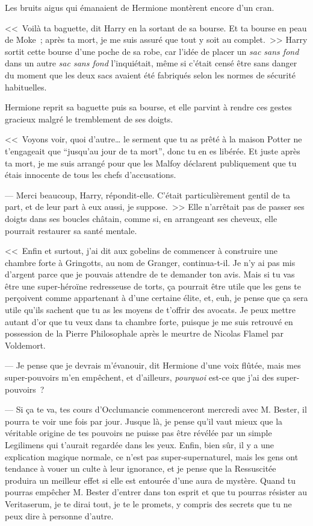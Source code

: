 Les bruits aigus qui émanaient de Hermione montèrent encore d'un cran.

<<~Voilà ta baguette, dit Harry en la sortant de sa bourse. Et ta bourse en peau de Moke~; après ta mort, je me suis assuré que tout y soit au complet.~>> Harry sortit cette bourse d'une poche de sa robe, car l'idée de placer un \emph{sac sans fond} dans un autre \emph{sac sans fond} l'inquiétait, même si c'était censé être sans danger du moment que les deux sacs avaient été fabriqués selon les normes de sécurité habituelles.

Hermione reprit sa baguette puis sa bourse, et elle parvint à rendre ces gestes gracieux malgré le tremblement de ses doigts.

<<~Voyons voir, quoi d'autre… le serment que tu as prêté à la maison Potter ne t'engageait que “jusqu'au jour de ta mort”, donc tu en es libérée. Et juste après ta mort, je me suis arrangé pour que les Malfoy déclarent publiquement que tu étais innocente de tous les chefs d'accusations.

--- Merci beaucoup, Harry, répondit-elle. C'était particulièrement gentil de ta part, et de leur part à eux aussi, je suppose.~>> Elle n'arrêtait pas de passer ses doigts dans ses boucles châtain, comme si, en arrangeant ses cheveux, elle pourrait restaurer sa santé mentale.

<<~Enfin et surtout, j'ai dit aux gobelins de commencer à construire une chambre forte à Gringotts, au nom de Granger, continua-t-il. Je n'y ai pas mis d'argent parce que je pouvais attendre de te demander ton avis. Mais si tu vas être une super-héroïne redresseuse de torts, ça pourrait être utile que les gens te perçoivent comme appartenant à d'une certaine élite, et, euh, je pense que ça sera utile qu'ils sachent que tu as les moyens de t'offrir des avocats. Je peux mettre autant d'or que tu veux dans ta chambre forte, puisque je me suis retrouvé en possession de la Pierre Philosophale après le meurtre de Nicolas Flamel par Voldemort.

--- Je pense que je devrais m'évanouir, dit Hermione d'une voix flûtée, mais mes super-pouvoirs m'en empêchent, et d'ailleurs, \emph{pourquoi} est-ce que j'ai des super-pouvoirs~?

--- Si ça te va, tes cours d'Occlumancie commenceront mercredi avec M. Bester, il pourra te voir une fois par jour. Jusque là, je pense qu'il vaut mieux que la véritable origine de tes pouvoirs ne puisse pas être révélée par un simple Legilimens qui t'aurait regardée dans les yeux. Enfin, bien sûr, il y a une explication magique normale, ce n'est pas super-supernaturel, mais les gens ont tendance à vouer un culte à leur ignorance, et je pense que la Ressuscitée produira un meilleur effet si elle est entourée d'une aura de mystère. Quand tu pourras empêcher M. Bester d'entrer dans ton esprit et que tu pourras résister au Veritaserum, je te dirai tout, je te le promets, y compris des secrets que tu ne peux dire à personne d'autre.

